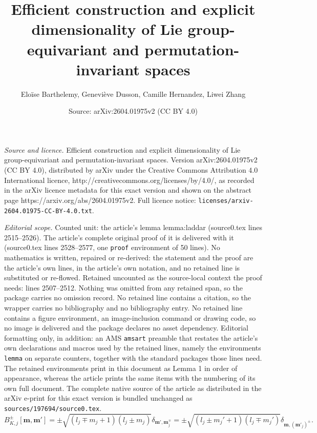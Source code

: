 \documentclass[10pt,a4paper]{amsart}
\title{Efficient construction and explicit dimensionality of Lie group-equivariant and permutation-invariant spaces}
\author{Elo\"ise Barthelemy, Genevi\`eve Dusson, Camille Hernandez, Liwei Zhang}
\date{Source: arXiv:2604.01975v2 (CC BY 4.0)}
\def\Bpm{B^{\pm}}
\def\bbm{{\bm m}}
\begin{document}
\maketitle

\noindent\emph{Source and licence.} Efficient construction and explicit dimensionality of Lie group-equivariant and permutation-invariant spaces. Version arXiv:2604.01975v2 (CC BY 4.0), distributed by arXiv under the Creative Commons Attribution 4.0 International licence, http://creativecommons.org/licenses/by/4.0/, as recorded in the arXiv licence metadata for this exact version and shown on the abstract page https://arxiv.org/abs/2604.01975v2. Full licence notice: \texttt{licenses/arxiv-2604.01975-CC-BY-4.0.txt}.\par\smallskip

\noindent\textit{Editorial scope.} Counted unit: the article's lemma lemma:laddar (source0.tex lines 2515--2526). The article's complete original proof of it is delivered with it (source0.tex lines 2528--2577, one \texttt{proof} environment of 50 lines). No mathematics is written, repaired or re-derived: the statement and the proof are the article's own lines, in the article's own notation, and no retained line is substituted or re-flowed.  Retained uncounted as the source-local context the proof needs: lines 2507--2512.  Nothing was omitted from any retained span, so the package carries no omission record.  No retained line contains a citation, so the wrapper carries no bibliography and no bibliography entry.  No retained line contains a figure environment, an image-inclusion command or drawing code, so no image is delivered and the package declares no asset dependency.  Editorial formatting only, in addition: an AMS \texttt{amsart} preamble that restates the article's own declarations and macros used by the retained lines, namely the environments \texttt{lemma} on separate counters, together with the standard packages those lines need.  The retained environments print in this document as Lemma 1 in order of appearance, whereas the article prints the same items with the numbering of its own full document.  The complete native source of the article as distributed in the arXiv e-print for this exact version is bundled unchanged as \texttt{sources/197694/source0.tex}.
\begin{equation}
\label{eq:Bpm}
        \Bpm_{K,j}[\bbm,\bbm'] 
        = \pm\sqrt{(l_j\mp m_j+1)(l_j\pm m_j)}\delta_{\bbm',\bbm_j^\mp} 
        = \pm\sqrt{(l_j\pm m_j'+1)(l_j\mp m_j')}\delta_{\bbm,({\bbm'}_j)^\pm}.
\end{equation}
\end{document}
